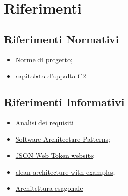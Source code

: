 \section{Riferimenti}
\subsection{Riferimenti Normativi}
\begin{itemize}
    \item \href{https://github.com/SWEasabi/norme-di-progetto/releases}{Norme di progetto};
    \item \href{https://www.math.unipd.it/~tullio/IS-1/2022/Progetto/C2.pdf}{capitolato d'appalto C2}.
\end{itemize}

\subsection{Riferimenti Informativi}
\begin{itemize}
    \item \href{https://github.com/SWEasabi/analisi-dei-requisiti/releases}{Analisi dei requisiti}
    \item \href{https://www.math.unipd.it/~rcardin/swea/2022/Software%20Architecture%20Patterns.pdf}{Software Architecture Patterns};
    \item \href{https://jwt.io/}{JSON Web Token website};
    \item \href{https://dev.to/dyarleniber/hexagonal-architecture-and-clean-architecture-with-examples-48oi}{clean architecture with examples};
    \item \href{https://herbertograca.com/2017/11/16/explicit-architecture-01-ddd-hexagonal-onion-clean-cqrs-how-i-put-it-all-together/}{Architettura esagonale}
\end{itemize}